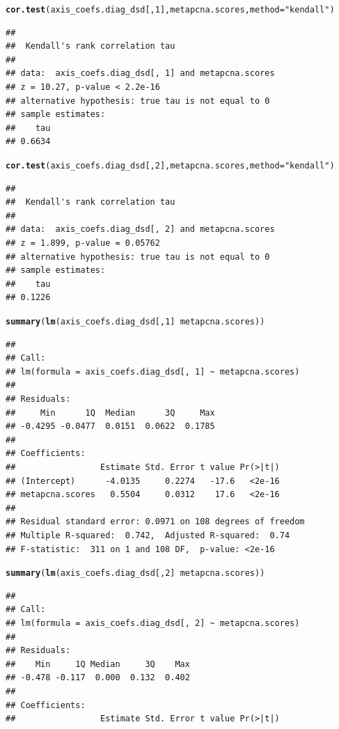 \documentclass{article}\usepackage[]{graphicx}\usepackage[]{color}
\makeatletter
\newcommand{\hlnum}[1]{\textcolor[rgb]{0.686,0.059,0.569}{#1}}%
\newcommand{\hlstr}[1]{\textcolor[rgb]{0.192,0.494,0.8}{#1}}%
\newcommand{\hlopt}[1]{\textcolor[rgb]{0,0,0}{#1}}%
\newcommand{\hlstd}[1]{\textcolor[rgb]{0.345,0.345,0.345}{#1}}%
\newcommand{\hlkwc}[1]{\textcolor[rgb]{0.333,0.667,0.333}{#1}}%
\newcommand{\hlkwd}[1]{\textcolor[rgb]{0.737,0.353,0.396}{\textbf{#1}}}%
\newenvironment{kframe}{%
 \def\at@end@of@kframe{}%
 \ifinner\ifhmode%
  \def\at@end@of@kframe{\end{minipage}}%
  \begin{minipage}{\columnwidth}%
 \fi\fi%
 \def\FrameCommand##1{\hskip\@totalleftmargin \hskip-\fboxsep
 \colorbox{shadecolor}{##1}\hskip-\fboxsep
     \hskip-\linewidth \hskip-\@totalleftmargin \hskip\columnwidth}%
 \MakeFramed {\advance\hsize-\width
   \@totalleftmargin\z@ \linewidth\hsize
   \@setminipage}}%
 {\par\unskip\endMakeFramed%
 \at@end@of@kframe}
\newenvironment{knitrout}{}{} %
\makeatother
\begin{document}
\begin{knitrout}
\begin{kframe}\begin{alltt}
\hlkwd{cor.test}\hlstd{(axis_coefs.diag_dsd[,} \hlnum{1}\hlstd{], metapcna.scores,} \hlkwc{method} \hlstd{=} \hlstr{"kendall"}\hlstd{)}
\end{alltt}
\begin{verbatim}
## 
## 	Kendall's rank correlation tau
## 
## data:  axis_coefs.diag_dsd[, 1] and metapcna.scores
## z = 10.27, p-value < 2.2e-16
## alternative hypothesis: true tau is not equal to 0
## sample estimates:
##    tau 
## 0.6634
\end{verbatim}
\begin{alltt}
\hlkwd{cor.test}\hlstd{(axis_coefs.diag_dsd[,} \hlnum{2}\hlstd{], metapcna.scores,} \hlkwc{method} \hlstd{=} \hlstr{"kendall"}\hlstd{)}
\end{alltt}
\begin{verbatim}
## 
## 	Kendall's rank correlation tau
## 
## data:  axis_coefs.diag_dsd[, 2] and metapcna.scores
## z = 1.899, p-value = 0.05762
## alternative hypothesis: true tau is not equal to 0
## sample estimates:
##    tau 
## 0.1226
\end{verbatim}
\begin{alltt}
\hlkwd{summary}\hlstd{(}\hlkwd{lm}\hlstd{(axis_coefs.diag_dsd[,} \hlnum{1}\hlstd{]} \hlopt{~} \hlstd{metapcna.scores))}
\end{alltt}
\begin{verbatim}
## 
## Call:
## lm(formula = axis_coefs.diag_dsd[, 1] ~ metapcna.scores)
## 
## Residuals:
##     Min      1Q  Median      3Q     Max 
## -0.4295 -0.0477  0.0151  0.0622  0.1785 
## 
## Coefficients:
##                 Estimate Std. Error t value Pr(>|t|)
## (Intercept)      -4.0135     0.2274   -17.6   <2e-16
## metapcna.scores   0.5504     0.0312    17.6   <2e-16
## 
## Residual standard error: 0.0971 on 108 degrees of freedom
## Multiple R-squared:  0.742,	Adjusted R-squared:  0.74 
## F-statistic:  311 on 1 and 108 DF,  p-value: <2e-16
\end{verbatim}
\begin{alltt}
\hlkwd{summary}\hlstd{(}\hlkwd{lm}\hlstd{(axis_coefs.diag_dsd[,} \hlnum{2}\hlstd{]} \hlopt{~} \hlstd{metapcna.scores))}
\end{alltt}
\begin{verbatim}
## 
## Call:
## lm(formula = axis_coefs.diag_dsd[, 2] ~ metapcna.scores)
## 
## Residuals:
##    Min     1Q Median     3Q    Max 
## -0.478 -0.117  0.000  0.132  0.402 
## 
## Coefficients:
##                 Estimate Std. Error t value Pr(>|t|)

\end{verbatim}
\end{kframe}
\end{knitrout}
\end{document}
